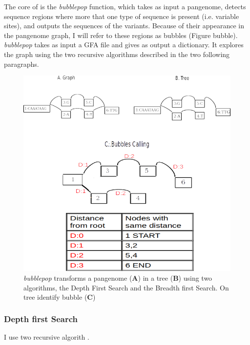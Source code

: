 The core of \vgp is the \textit{bubblepop} function, which takes as input a pangenome, detects sequence regions where more that one type of sequence is present (i.e. variable sites), and outputs the sequences of the variants. Because of their appearance in the pangenome graph, I will refer to these regions as bubbles (Figure bubble). \\

\textit{bubblepop} takes as input a GFA file and gives as output a dictionary. It explores the graph using the two recursive algorithms described in the two following paragraphs.

\begin{figure}[H]
\centering
\includegraphics[width=1.00\textwidth]{fig/bubblepop.png}
\decoRule
\caption{\textit{bubblepop} transforms a pangenome (\textbf{A}) in a tree (\textbf{B}) using two algorithms, the Depth First Search and the Breadth first Search. On tree identify bubble (\textbf{C})}
\label{fig:bubblepop.png}
\end{figure}




\setcounter{secnumdepth}{3}
\subsubsection{Depth first Search}

I use two recursive algorith \cite{geeksforgeeks.org}.


